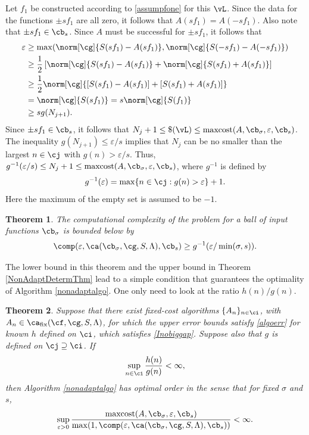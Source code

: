 \documentclass[]{elsarticle}
\DeclareMathOperator{\fix}{fix}
\DeclareMathOperator{\maxcost}{maxcost}
\newtheorem{theorem}{Theorem}
\theoremstyle{definition}
\theoremstyle{remark}
\begin{document}
Let $f_1$ be constructed according to \eqref{assumpfone} for this $\vL$.  Since the data for the functions $\pm s f_1$ are all zero, it follows that $A(s f_1)=A(-s f_1)$.  Also note that $\pm s f_1 \in \cb_{s}$.  Since $A$ must be successful for $\pm s f_1$, it follows that 
\begin{align*}
\varepsilon & \ge \max(\norm[\cg]{S(sf_1)-A(sf_1)},\norm[\cg]{S(-sf_1)-A(-sf_1)}) \\
& \ge \frac{1}{2} \left[ \norm[\cg]{S(sf_1)-A(sf_1)}+ \norm[\cg]{S(sf_1)+A(sf_1)} \right] \\
& \ge \frac{1}{2} \norm[\cg]{[S(sf_1)-A(sf_1)]+[S(sf_1)+A(sf_1)]} \\
& = \norm[\cg]{S(sf_1)}= s\norm[\cg]{S(f_1)}  \\
& \ge s g(N_{j+1}).
\end{align*}
Since $\pm s f_1 \in \cb_s$, it follows that $N_{j}+1 \le \$(\vL) \le \maxcost(A,\cb_{\sigma},\varepsilon,\cb_{s})$.  The inequality $g(N_{j+1}) \le \varepsilon/s$ implies that $N_{j}$ can be no smaller than the largest $n \in \cj$ with $g(n) > \varepsilon/s$.  Thus, $g^{-1}(\varepsilon/s) \le N_{j}+1 \le \maxcost(A,\cb_{\sigma},\varepsilon,\cb_{s})$, where $g^{-1}$ is defined by
\begin{equation*} \label{ginvdef}
g^{-1}(\varepsilon) = \max \{ n \in \cj : g(n) > \varepsilon\}+1.
\end{equation*}
Here the maximum of the empty set is assumed to be $-1$.

\begin{theorem} \label{complowbdball} The computational complexity of the problem for a ball of input functions $\cb_{\sigma}$ is bounded below by
\begin{equation*}
\comp(\varepsilon,\ca(\cb_{\sigma},\cg,S,\Lambda),\cb_s) \ge
g ^{-1}(\varepsilon/\min(\sigma,s)).
\end{equation*}
\end{theorem}

The lower bound in this theorem and the upper bound in Theorem \ref{NonAdaptDetermThm} lead to a simple condition that guarantees the optimality of Algorithm \ref{nonadaptalgo}.  One only need to look at the ratio $h(n)/g(n)$.

\begin{theorem} \label{optimalprop} Suppose that there exist fixed-cost algorithms $\{A_n\}_{n \in \ci}$, with $A_n  \in \ca_{\fix}(\cf,\cg,S,\Lambda)$, for which the upper error bounds satisfy \eqref{algoerr} for known $h$ defined on $\ci$, which satisfies \eqref{Inobiggap}.  Suppose also that $g$ is defined on $\cj \supseteq \ci$. If 
\begin{equation}\label{ghcond}
\sup_{n \in \ci} \frac{h(n)}{g(n)} < \infty,
\end{equation}
then Algorithm \ref{nonadaptalgo} has optimal order in the sense that for fixed $\sigma$ and $s$, 
\begin{equation*} \label{balloptresult}
\sup_{\varepsilon > 0} \frac{\maxcost(A,\cb_{\sigma},\varepsilon,\cb_{s})}
{\max(1,\comp(\varepsilon,\ca(\cb_{\sigma},\cg,S,\Lambda),\cb_s))} <\infty.
\end{equation*}
\end{theorem}
\end{document}
